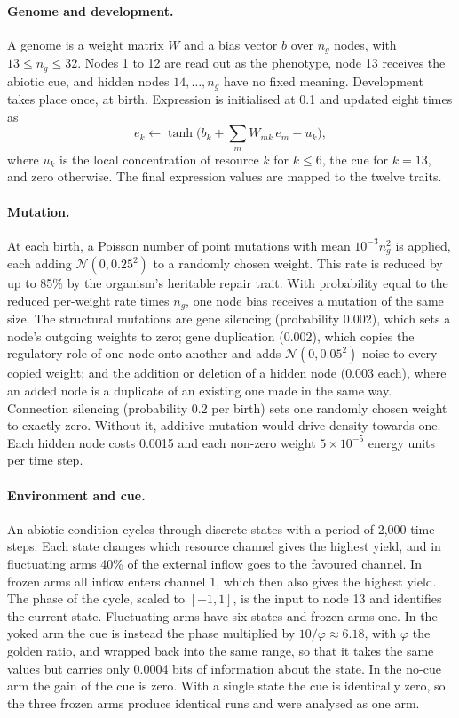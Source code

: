 \paragraph*{Genome and development.} A genome is a weight matrix $W$ and a bias
vector $b$ over $n_g$ nodes, with $13 \le n_g \le 32$. Nodes 1 to 12 are read out
as the phenotype, node 13 receives the abiotic cue, and hidden nodes
$14,\dots,n_g$ have no fixed meaning. Development takes place once, at birth.
Expression is initialised at 0.1 and updated eight times as
\begin{equation}
e_k \leftarrow \tanh\Big(b_k + \sum_m W_{mk}\, e_m + u_k\Big),
\end{equation}
where $u_k$ is the local concentration of resource $k$ for $k\le 6$, the cue for
$k=13$, and zero otherwise. The final expression values are mapped to the twelve
traits.

\paragraph*{Mutation.} At each birth, a Poisson number of point mutations with
mean $10^{-3} n_g^2$ is applied, each adding $\mathcal{N}(0,0.25^2)$ to a randomly
chosen weight. This rate is reduced by up to 85\% by the organism's heritable
repair trait. With probability equal to the reduced per-weight rate times $n_g$,
one node bias receives a mutation of the same size. The structural mutations are
gene silencing (probability 0.002), which sets a node's outgoing weights to zero;
gene duplication (0.002), which copies the regulatory role of one node onto
another and adds $\mathcal{N}(0,0.05^2)$ noise to every copied weight; and the
addition or deletion of a hidden node (0.003 each), where an added node is a
duplicate of an existing one made in the same way. Connection silencing
(probability 0.2 per birth) sets one randomly chosen weight to exactly zero.
Without it, additive mutation would drive density towards one. Each hidden node
costs 0.0015 and each non-zero weight $5\times10^{-5}$ energy units per time
step.

\paragraph*{Environment and cue.} An abiotic condition cycles through discrete
states with a period of 2{,}000 time steps. Each state changes which resource
channel gives the highest yield, and in fluctuating arms 40\% of the external
inflow goes to the favoured channel. In frozen arms all inflow enters channel 1,
which then also gives the highest yield. The phase of the cycle, scaled to $[-1,1]$, is the input to node 13 and
identifies the current state. Fluctuating arms have six states and frozen arms
one. In the yoked arm the cue is instead the phase multiplied by
$10/\varphi\approx6.18$, with $\varphi$ the golden ratio, and wrapped back into
the same range, so that it takes the same values but carries only 0.0004 bits of
information about the state. In the no-cue arm the gain of the cue is
zero. With a single state the cue is identically zero, so the three frozen arms
produce identical runs and were analysed as one arm.

